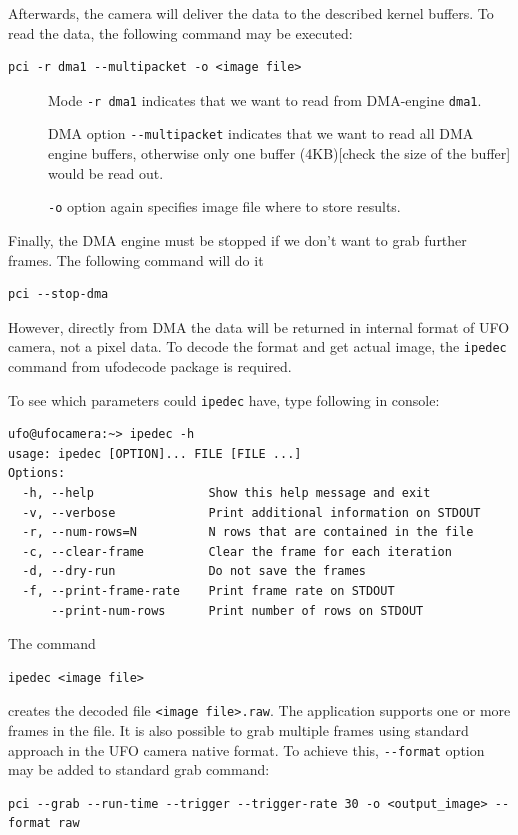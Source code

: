 Afterwards, the camera will deliver the data to the described kernel buffers. To read the data, the following command may be executed:
\begin{verbatim}
pci -r dma1 --multipacket -o <image file>
\end{verbatim}

\begin{description}
\item[ ] Mode \verb/-r dma1/ indicates that we want to read from DMA-engine \verb/dma1/.
\item[ ] DMA option \verb/--multipacket/ indicates that we want to read all DMA engine buffers, otherwise only one buffer (4KB)[check the size of the buffer] would be read out.
\item[ ] \verb/-o/ option again specifies image file where to store results.
\end{description}

Finally, the DMA engine must be stopped if we don't want to grab further frames. The following command will do it
\begin{verbatim}
pci --stop-dma
\end{verbatim}


However, directly from DMA the data will be returned in internal format of UFO camera, not a pixel data. To decode the format and get actual image, the \verb/ipedec/ command from ufodecode package is required.

To see which parameters could \verb/ipedec/ have, type following in console:
\begin{lstlisting}
ufo@ufocamera:~> ipedec -h
usage: ipedec [OPTION]... FILE [FILE ...]
Options:
  -h, --help                Show this help message and exit
  -v, --verbose             Print additional information on STDOUT
  -r, --num-rows=N          N rows that are contained in the file
  -c, --clear-frame         Clear the frame for each iteration
  -d, --dry-run             Do not save the frames
  -f, --print-frame-rate    Print frame rate on STDOUT
      --print-num-rows      Print number of rows on STDOUT
\end{lstlisting}

The command 
\begin{verbatim}
ipedec <image file>
\end{verbatim}
creates the decoded file \verb/<image file>.raw/. The application supports one or more frames in the file. It is also possible to grab multiple frames using standard approach in the UFO camera native format. To achieve this, \verb/--format/ option may be added to standard grab command:
\begin{verbatim}
pci --grab --run-time --trigger --trigger-rate 30 -o <output_image> --format raw
\end{verbatim}


